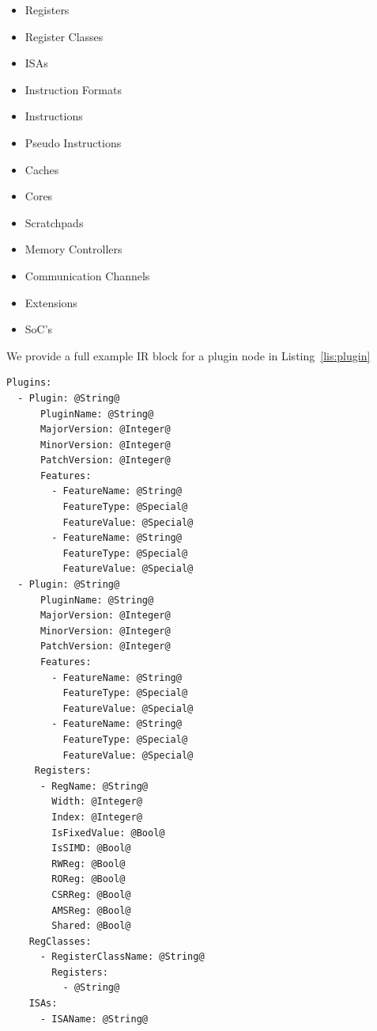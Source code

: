 \documentclass{article}
\begin{document}
\begin{itemize}
\item Registers
\item Register Classes
\item ISAs
\item Instruction Formats
\item Instructions
\item Pseudo Instructions
\item Caches
\item Cores
\item Scratchpads
\item Memory Controllers
\item Communication Channels
\item Extensions
\item SoC's
\end{itemize}

We provide a full example IR block for a plugin node in Listing~\ref{lis:plugin}

\vspace{0.125in}
\begin{lstlisting}[frame=single,style=base,caption={Plugin Node Definition},captionpos=b,label={lis:plugin}]
Plugins:
  - Plugin: @String@
      PluginName: @String@
      MajorVersion: @Integer@
      MinorVersion: @Integer@
      PatchVersion: @Integer@
      Features:
        - FeatureName: @String@
          FeatureType: @Special@
          FeatureValue: @Special@
        - FeatureName: @String@
          FeatureType: @Special@
          FeatureValue: @Special@
  - Plugin: @String@
      PluginName: @String@
      MajorVersion: @Integer@
      MinorVersion: @Integer@
      PatchVersion: @Integer@
      Features:
        - FeatureName: @String@
          FeatureType: @Special@
          FeatureValue: @Special@
        - FeatureName: @String@
          FeatureType: @Special@
          FeatureValue: @Special@
     Registers:
      - RegName: @String@
        Width: @Integer@
        Index: @Integer@
        IsFixedValue: @Bool@
        IsSIMD: @Bool@
        RWReg: @Bool@
        ROReg: @Bool@
        CSRReg: @Bool@
        AMSReg: @Bool@
        Shared: @Bool@
    RegClasses:
      - RegisterClassName: @String@
        Registers:
          - @String@
    ISAs:
      - ISAName: @String@
\end{lstlisting}

\end{document}
